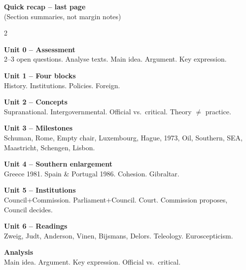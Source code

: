 \documentclass[8pt,landscape,a4paper]{article}
\begin{document}
\newpage
\vspace*{0.3em}
\begin{center}
\textbf{\color{eublue}Quick recap -- last page}\\[0.3em]
\small\textcolor{notegrey}{(Section summaries, not margin notes)}
\end{center}
\vspace{0.4em}
\noindent\color{notegrey}
\setlength{\parskip}{0.3em}
\begin{multicols}{2}

\textbf{Unit 0 -- Assessment}\\
2--3 open questions. Analyse texts. Main idea. Argument. Key expression.

\textbf{Unit 1 -- Four blocks}\\
History. Institutions. Policies. Foreign.

\textbf{Unit 2 -- Concepts}\\
Supranational. Intergovernmental. Official vs.\ critical. Theory $\neq$ practice.

\textbf{Unit 3 -- Milestones}\\
Schuman, Rome, Empty chair, Luxembourg, Hague, 1973, Oil, Southern, SEA, Maastricht, Schengen, Lisbon.

\textbf{Unit 4 -- Southern enlargement}\\
Greece 1981. Spain \& Portugal 1986. Cohesion. Gibraltar.

\textbf{Unit 5 -- Institutions}\\
Council+Commission. Parliament+Council. Court. Commission proposes, Council decides.

\textbf{Unit 6 -- Readings}\\
Zweig, Judt, Anderson, Vinen, Bijsmans, Delors. Teleology. Euroscepticism.

\textbf{Analysis}\\
Main idea. Argument. Key expression. Official vs.\ critical.

\end{multicols}
\vfill
\normalsize\normalfont\color{black}
\end{document}
